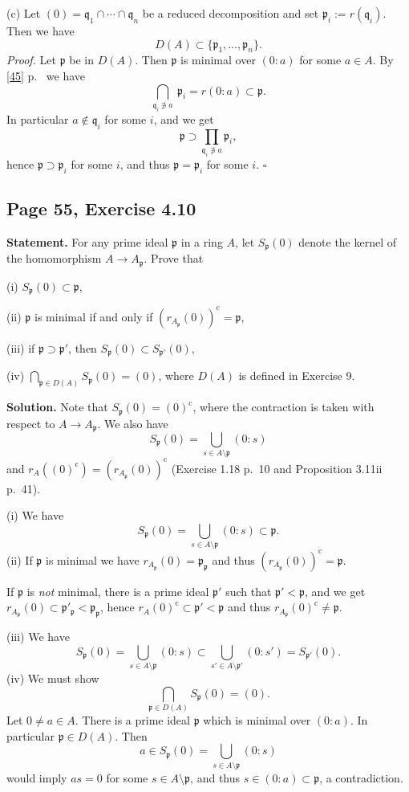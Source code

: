 \documentclass[parskip=half,fontsize=12pt]{scrartcl}%
\newcommand{\oo}{\operatorname}\newcommand{\ooo}{\operatorname*}
\newcommand{\mf}{\mathfrak}
\newcommand{\ppp}{\mf p}
\newcommand{\qqq}{\mf q}
\begin{document}
(c) Let $(0)=\qqq_1\cap\cdots\cap\qqq_n$ be a reduced decomposition and set $\ppp_i:=r(\qqq_i)$. Then we have 
$$
D(A)\subset\{\ppp_1,\dots,\ppp_n\}.
$$ 
\emph{Proof.} Let $\ppp$ be in $D(A)$. Then $\ppp$ is minimal over $(0:a)$ for some $a\in A$. By \eqref{45} p.~\pageref{45} we have 
$$
\bigcap_{\qqq_i\not\ni a}\ \ppp_i=r(0:a)\subset\ppp.
$$ 
In particular $a\notin\qqq_i$ for some $i$, and we get 
$$
\ppp\supset\prod_{\qqq_i\not\ni a}\ppp_i,
$$ 
hence $\ppp\supset\ppp_i$ for some $i$, and thus $\ppp=\ppp_i$ for some $i$. $\square$

\subsection{Page 55, Exercise 4.10}%

\textbf{Statement.} For any prime ideal $\ppp$ in a ring $A$, let $S_\ppp(0)$ denote the kernel of the homomorphism $A\to A_\ppp$. Prove that

(i) $S_\ppp(0)\subset\ppp$,

(ii) $\ppp$ is minimal if and only if $(r_{A_\ppp}(0))^{\oo c}=\ppp$,

(iii) if $\ppp\supset\ppp'$, then $S_\ppp(0)\subset S_{\ppp'}(0)$,

(iv) $\bigcap_{\ppp\in D(A)}S_\ppp(0)=(0)$, where $D(A)$ is defined in Exercise 9.

\textbf{Solution.} Note that $S_\ppp(0)=(0)^{\oo c}$, where the contraction is taken with respect to $A\to A_\ppp$. We also have 
$$
S_\ppp(0)=\bigcup_{s\in A\setminus\ppp}(0:s)
$$ 
and $r_A((0)^{\oo c})=(r_{A_\ppp}(0))^{\oo c}$ (Exercise 1.18 p.~10 and Proposition 3.11ii p.~41).

(i) We have 
$$
S_\ppp(0)=\bigcup_{s\in A\setminus\ppp}(0:s)\subset\ppp.
$$
(ii) %
If $\ppp$ is minimal we have $r_{A_\ppp}(0)=\ppp_\ppp$ and thus $(r_{A_\ppp}(0))^{\oo c}=\ppp$. 

If $\ppp$ is \emph{not} minimal, there is a prime ideal $\ppp'$ such that $\ppp'<\ppp$, and we get $r_{A_\ppp}(0)\subset\ppp'_\ppp<\ppp_\ppp$, hence $r_A(0)^{\oo c}\subset\ppp'<\ppp$ and thus $r_{A_\ppp}(0)^{\oo c}\ne\ppp$.

(iii) %
We have 
$$
S_\ppp(0)=\bigcup_{s\in A\setminus\ppp}(0:s)\subset\bigcup_{s'\in A\setminus\ppp'}(0:s')=S_{\ppp'}(0).
$$
(iv) We must show 
$$
\bigcap_{\ppp\in D(A)}S_\ppp(0)=(0).
$$ 
Let $0\ne a\in A$. There is a prime ideal $\ppp$ which is minimal over $(0:a)$. In particular $\ppp\in D(A)$. Then 
$$
a\in S_\ppp(0)=\bigcup_{s\in A\setminus\ppp}(0:s)
$$ 
would imply $as=0$ for some $s\in A\setminus\ppp$, and thus $s\in(0:a)\subset\ppp$, a contradiction.
\end{document}
